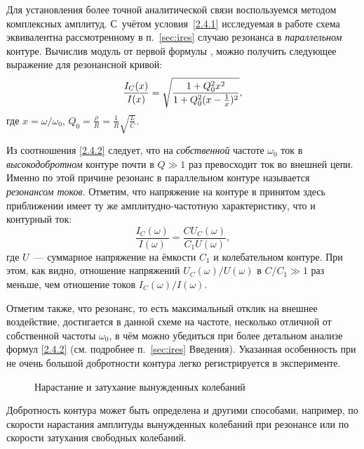 Для установления более точной аналитической связи воспользуемся 
методом комплексных амплитуд. С~учётом условия~\eqref{2.4.1} 
исследуемая в работе схема эквивалентна рассмотренному в п.~\ref{sec:ires} 
случаю резонанса в \emph{параллельном} контуре. 
Вычислив модуль от первой формулы , можно получить следующее выражение
для резонансной кривой:
\begin{equation}
\eqmark{2.4.2}
\frac{I_C(x)}{I(x)} = 
\sqrt{\frac{1+Q_0^2x^2}{1+Q_0^2(x-\frac1x)^2}},
\end{equation}
где $x=\omega/\omega_0$, 
$Q_0 = \frac{\rho}{R} = \frac{1}{R}\sqrt{\frac{L}{C}}$.

Из соотношения \eqref{2.4.2} следует, 
что на \emph{собственной} частоте $\omega_0$ ток в \emph{высокодобротном} 
контуре почти в $Q\gg 1$ раз превосходит ток во внешней цепи. 
Именно по этой причине резонанс в параллельном контуре называется 
\emph{резонансом токов}. 
Отметим, что напряжение на контуре в принятом здесь приближении имеет ту 
же амплитудно-частотную характеристику, что и контурный ток:
\[
\frac{I_C(\omega)}{I(\omega)} = \frac{CU_C(\omega)}{C_1 U(\omega)},
\]
где $U$~--- суммарное напряжение на ёмкости $C_1$ и колебательном контуре.
При этом, как видно, отношение напряжений $U_C(\omega)/U(\omega)$ в $C/C_1\gg1$ 
раз меньше, чем отношение токов $I_C(\omega)/I(\omega)$.

Отметим также, что резонанс, то есть максимальный отклик на внешнее воздействие, 
достигается в данной схеме на частоте, несколько отличной от собственной частоты 
$\omega_0$, в чём можно убедиться при более детальном анализе формул \eqref{2.4.2}
(см. подробнее п.~\ref{sec:ires} Введения). 
Указанная особенность при не очень большой добротности контура легко регистрируется 
в эксперименте.



\begin{figure}
    \centering
    \caption{Нарастание и затухание вынужденных колебаний}
\end{figure}

Добротность контура может быть определена и другими способами, например, 
по скорости нарастания амплитуды вынужденных колебаний при резонансе 
или по скорости затухания свободных колебаний. 

